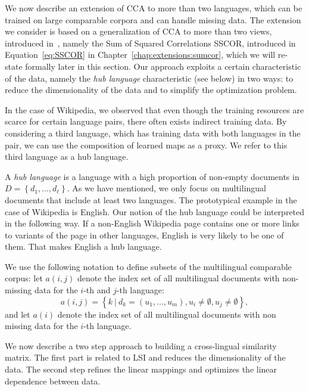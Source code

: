 We now describe an extension of CCA to more than two languages, which can be trained on 
large comparable corpora and can handle missing data. The extension we consider is based on 
a generalization of CCA to more than two views, introduced in~\cite{Kettenring}, namely 
the Sum of Squared Correlations SSCOR, introduced in Equation~\ref{eq:SSCOR} in 
Chapter~\ref{chap:extensions:sumcor}, which we will re-state formally later in this section. 
Our approach exploits a certain characteristic of the data, namely the \emph{hub language} 
characteristic (see below) in two ways: to reduce the dimensionality of the data and to 
simplify the optimization problem.

In the case of Wikipedia, we observed that even though the training resources are scarce 
for certain language pairs, there often exists indirect training data. By considering 
a third language, which has training data with both languages in the pair,  we can use 
the composition of learned maps as a proxy. We refer to this third language as a hub language.

A \emph{hub language} is a language with a high proportion of non-empty documents in 
$D = \left\{d_1,..., d_{\ell}\right\}$. As we have mentioned, we only focus on multilingual 
documents that include at least two languages. The prototypical example in the case of 
Wikipedia is English. Our notion of the hub language could be interpreted in the following 
way. If a non-English Wikipedia page contains one or more links to variants of the page in 
other languages, English is very likely to be one of them. That makes English a hub language.

We use the following notation to define subsets of the multilingual comparable corpus: 
let $a(i,j)$ denote the index set of all multilingual documents with non-missing data 
for the $i$-th and $j$-th language: 
$$a(i,j) = \left\{k~ |~ d_k = (u_1,...,u_m), u_i \neq \emptyset, u_j \neq \emptyset \right\},$$ 
and let $a(i)$ denote the index set of all multilingual documents with non missing data 
for the $i$-th language.

We now describe a two step approach to building a cross-lingual similarity matrix. 
The first part is related to LSI and reduces the dimensionality of the data. The second 
step refines the linear mappings and optimizes the linear dependence between data.


